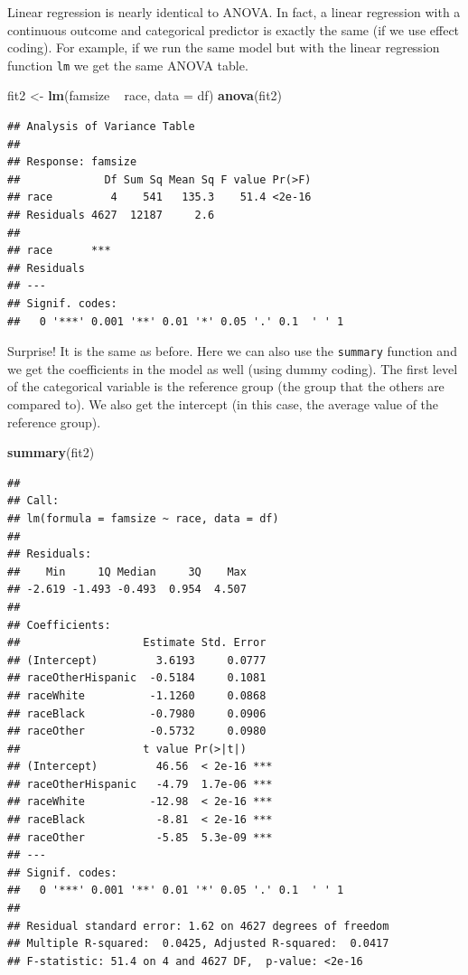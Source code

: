 \documentclass[]{tufte-book}
\newenvironment{Shaded}{}{}
\newcommand{\KeywordTok}[1]{\textcolor[rgb]{0.00,0.44,0.13}{\textbf{#1}}}
\newcommand{\DataTypeTok}[1]{\textcolor[rgb]{0.56,0.13,0.00}{#1}}
\newcommand{\StringTok}[1]{\textcolor[rgb]{0.25,0.44,0.63}{#1}}
\newcommand{\OperatorTok}[1]{\textcolor[rgb]{0.40,0.40,0.40}{#1}}
\newcommand{\NormalTok}[1]{#1}
\theoremstyle{definition}
\theoremstyle{definition}
\theoremstyle{remark}
\begin{document}
Linear regression is nearly identical to ANOVA. In fact, a linear
regression with a continuous outcome and categorical predictor is
exactly the same (if we use effect coding). For example, if we run the
same model but with the linear regression function \texttt{lm} we get
the same ANOVA table.

\begin{Shaded}
\begin{Highlighting}[]
\NormalTok{fit2 <-}\StringTok{ }\KeywordTok{lm}\NormalTok{(famsize }\OperatorTok{~}\StringTok{ }\NormalTok{race, }\DataTypeTok{data =}\NormalTok{ df)}
\KeywordTok{anova}\NormalTok{(fit2)}
\end{Highlighting}
\end{Shaded}

\begin{verbatim}
## Analysis of Variance Table
## 
## Response: famsize
##             Df Sum Sq Mean Sq F value Pr(>F)
## race         4    541   135.3    51.4 <2e-16
## Residuals 4627  12187     2.6               
##              
## race      ***
## Residuals    
## ---
## Signif. codes:  
##   0 '***' 0.001 '**' 0.01 '*' 0.05 '.' 0.1  ' ' 1
\end{verbatim}

Surprise! It is the same as before. Here we can also use the
\texttt{summary} function and we get the coefficients in the model as
well (using dummy coding). The first level of the categorical variable
is the reference group (the group that the others are compared to). We
also get the intercept (in this case, the average value of the reference
group).

\begin{Shaded}
\begin{Highlighting}[]
\KeywordTok{summary}\NormalTok{(fit2)}
\end{Highlighting}
\end{Shaded}

\begin{verbatim}
## 
## Call:
## lm(formula = famsize ~ race, data = df)
## 
## Residuals:
##    Min     1Q Median     3Q    Max 
## -2.619 -1.493 -0.493  0.954  4.507 
## 
## Coefficients:
##                   Estimate Std. Error
## (Intercept)         3.6193     0.0777
## raceOtherHispanic  -0.5184     0.1081
## raceWhite          -1.1260     0.0868
## raceBlack          -0.7980     0.0906
## raceOther          -0.5732     0.0980
##                   t value Pr(>|t|)    
## (Intercept)         46.56  < 2e-16 ***
## raceOtherHispanic   -4.79  1.7e-06 ***
## raceWhite          -12.98  < 2e-16 ***
## raceBlack           -8.81  < 2e-16 ***
## raceOther           -5.85  5.3e-09 ***
## ---
## Signif. codes:  
##   0 '***' 0.001 '**' 0.01 '*' 0.05 '.' 0.1  ' ' 1
## 
## Residual standard error: 1.62 on 4627 degrees of freedom
## Multiple R-squared:  0.0425, Adjusted R-squared:  0.0417 
## F-statistic: 51.4 on 4 and 4627 DF,  p-value: <2e-16
\end{verbatim}
\end{document}
